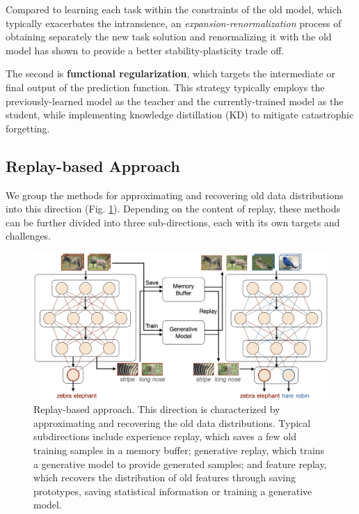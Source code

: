 Compared to learning each task within the constraints of the old model, which typically exacerbates the intransience, an \textit{expansion-renormalization} process of obtaining separately the new task solution and renormalizing it with the old model has shown to provide a better stability-plasticity trade off.

The second is \textbf{functional regularization}, which targets the intermediate or final output of the prediction function. This strategy typically employs the previously-learned model as the teacher and the currently-trained model as the student, while implementing knowledge distillation (KD) to mitigate catastrophic forgetting.

\subsection{Replay-based Approach}
We group the methods for approximating and recovering old data distributions into this direction (Fig. \ref{cl_3}). Depending on the content of replay, these methods can be further divided into three sub-directions, each with its own targets and challenges.

\begin{figure}[H]
    \centering
    \includegraphics[width=0.7\linewidth]{imgs/continual_learning/cl_3.png}
    \caption{Replay-based approach. This direction is characterized by approximating and recovering the old data distributions. Typical subdirections include experience replay, which saves a few old training samples in a memory buffer; generative replay, which trains a generative model to provide generated samples; and feature replay, which recovers the distribution of old features through saving prototypes, saving statistical information or training a generative model.}
    \label{cl_3}
\end{figure}

